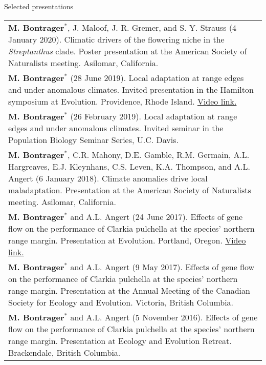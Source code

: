\documentclass[letterpaper,11pt,oneside]{article}
\begin{document}

\noindent\Large{Selected presentations}  
\normalsize
\bigskip

\def\arraystretch{1.2}
\noindent \begin{tabular}{@{} >{\raggedright\arraybackslash}p{16.51cm}}
\textbf{M. Bontrager}$^{*}$, J. Maloof, J. R. Gremer, and S. Y. Strauss (4 January 2020). Climatic drivers of the flowering niche in the \textit{Streptanthus} clade. Poster presentation at the American Society of Naturalists meeting. Asilomar, California. \\
\textbf{M. Bontrager}$^{*}$ (28 June 2019). Local adaptation at range edges and under anomalous climates. Invited presentation in the Hamilton symposium at Evolution. Providence, Rhode Island. \href{https://www.youtube.com/watch?v=UeK_zYEfVyA}{Video link.} \\
\textbf{M. Bontrager}$^{*}$ (26 February 2019). Local adaptation at range edges and under anomalous climates. Invited seminar in the Population Biology Seminar Series, U.C. Davis. \\
\textbf{M. Bontrager}$^{*}$, C.R. Mahony, D.E. Gamble, R.M. Germain, A.L. Hargreaves, E.J. Kleynhans, C.S. Leven, K.A. Thompson, and A.L. Angert (6 January 2018). Climate anomalies drive local maladaptation. Presentation at the American Society of Naturalists meeting. Asilomar, California. \\
\textbf{M. Bontrager}$^{*}$ and A.L. Angert (24 June 2017). Effects of gene flow on the performance of Clarkia pulchella at the species’ northern range margin. Presentation at Evolution. Portland, Oregon. \href{https://www.youtube.com/watch?v=HqVgQzIJLyA}{Video link.} \\
\textbf{M. Bontrager}$^{*}$ and A.L. Angert (9 May 2017). Effects of gene flow on the performance of Clarkia pulchella at the species’ northern range margin. Presentation at the Annual Meeting of the Canadian Society for Ecology and Evolution. Victoria, British Columbia. \\
\textbf{M. Bontrager}$^{*}$ and A.L. Angert (5 November 2016). Effects of gene flow on the performance of Clarkia pulchella at the species’ northern range margin. Presentation at Ecology and Evolution Retreat. Brackendale, British Columbia. \\
\end{tabular}
\def\arraystretch{1.2}
\end{document}
